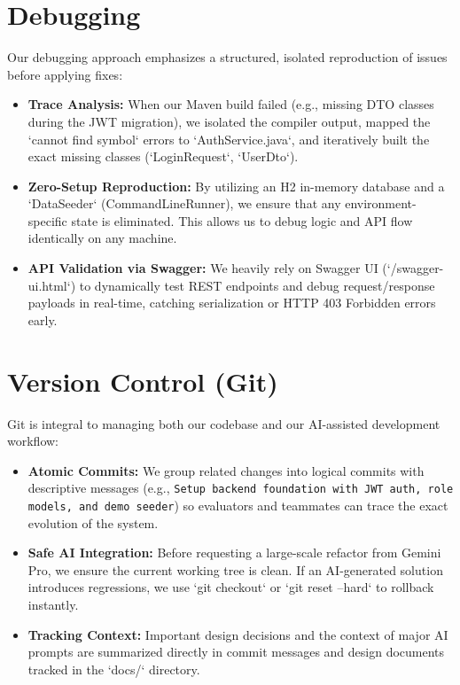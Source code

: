 \documentclass[11pt,a4paper]{article}
\begin{document}
\section{Debugging}
Our debugging approach emphasizes a structured, isolated reproduction of issues before applying fixes:
\begin{itemize}[noitemsep]
    \item \textbf{Trace Analysis:} When our Maven build failed (e.g., missing DTO classes during the JWT migration), we isolated the compiler output, mapped the `cannot find symbol` errors to `AuthService.java`, and iteratively built the exact missing classes (`LoginRequest`, `UserDto`).
    \item \textbf{Zero-Setup Reproduction:} By utilizing an H2 in-memory database and a `DataSeeder` (CommandLineRunner), we ensure that any environment-specific state is eliminated. This allows us to debug logic and API flow identically on any machine.
    \item \textbf{API Validation via Swagger:} We heavily rely on Swagger UI (`/swagger-ui.html`) to dynamically test REST endpoints and debug request/response payloads in real-time, catching serialization or HTTP 403 Forbidden errors early.
\end{itemize}

\section{Version Control (Git)}
Git is integral to managing both our codebase and our AI-assisted development workflow:
\begin{itemize}[noitemsep]
    \item \textbf{Atomic Commits:} We group related changes into logical commits with descriptive messages (e.g., \texttt{Setup backend foundation with JWT auth, role models, and demo seeder}) so evaluators and teammates can trace the exact evolution of the system.
    \item \textbf{Safe AI Integration:} Before requesting a large-scale refactor from Gemini Pro, we ensure the current working tree is clean. If an AI-generated solution introduces regressions, we use `git checkout` or `git reset --hard` to rollback instantly.
    \item \textbf{Tracking Context:} Important design decisions and the context of major AI prompts are summarized directly in commit messages and design documents tracked in the `docs/` directory.
\end{itemize}
\end{document}
